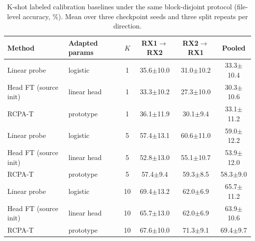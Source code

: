 \begin{table}[t]
\caption{K-shot labeled calibration baselines under the same block-disjoint protocol (file-level accuracy, \%). Mean over three checkpoint seeds and three split repeats per direction.}
\label{tab:kshot_baselines}
\centering
\small
\begin{tabular}{llcccc}
\toprule
Method & Adapted params & $K$ & RX1$\rightarrow$RX2 & RX2$\rightarrow$RX1 & Pooled \\
\midrule
Linear probe & logistic & 1 & 35.6$\pm$10.0 & 31.0$\pm$10.2 & 33.3$\pm$10.4 \\
Head FT (source init) & linear head & 1 & 33.3$\pm$10.2 & 27.3$\pm$10.0 & 30.3$\pm$10.6 \\
RCPA-T & prototype & 1 & 36.1$\pm$11.9 & 30.1$\pm$9.4 & 33.1$\pm$11.2 \\
Linear probe & logistic & 5 & 57.4$\pm$13.1 & 60.6$\pm$11.0 & 59.0$\pm$12.2 \\
Head FT (source init) & linear head & 5 & 52.8$\pm$13.0 & 55.1$\pm$10.7 & 53.9$\pm$12.0 \\
RCPA-T & prototype & 5 & 57.4$\pm$9.4 & 59.3$\pm$8.5 & 58.3$\pm$9.0 \\
Linear probe & logistic & 10 & 69.4$\pm$13.2 & 62.0$\pm$6.9 & 65.7$\pm$11.2 \\
Head FT (source init) & linear head & 10 & 65.7$\pm$13.0 & 62.0$\pm$6.9 & 63.9$\pm$10.6 \\
RCPA-T & prototype & 10 & 67.6$\pm$10.0 & 71.3$\pm$9.1 & 69.4$\pm$9.7 \\
\bottomrule
\end{tabular}
\end{table}
